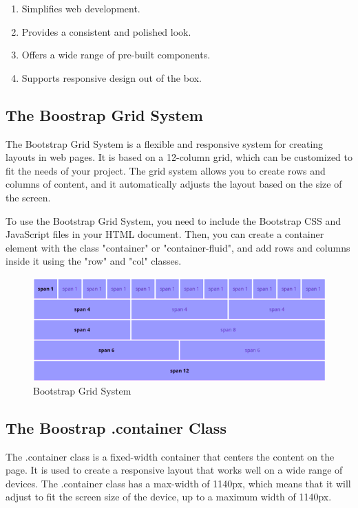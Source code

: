 \documentclass[11pt]{article}
\begin{document}
\begin{enumerate}
    \item Simplifies web development.
    \item Provides a consistent and polished look.
    \item Offers a wide range of pre-built components.
    \item Supports responsive design out of the box.
\end{enumerate}


\subsection{The Boostrap Grid System}

The Bootstrap Grid System is a flexible and responsive system for creating layouts in web pages. It is based on a 12-column grid, which can be customized to fit the needs of your project. The grid system allows you to create rows and columns of content, and it automatically adjusts the layout based on the size of the screen.

To use the Bootstrap Grid System, you need to include the Bootstrap CSS and JavaScript files in your HTML document. Then, you can create a container element with the class "container" or "container-fluid", and add rows and columns inside it using the "row" and "col" classes.

\begin{figure}[H]
    \centering
    \includegraphics[width=.95\textwidth]{Bootstrap-Grid-System-1.png}
    \caption{Bootstrap Grid System}
\end{figure}

\subsection{The Boostrap .container Class}

The .container class is a fixed-width container that centers the content on the page. It is used to create a responsive layout that works well on a wide range of devices. The .container class has a max-width of 1140px, which means that it will adjust to fit the screen size of the device, up to a maximum width of 1140px.
\end{document}
